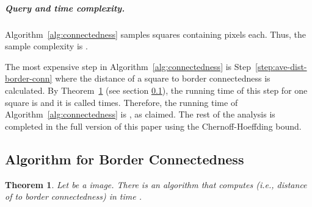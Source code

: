 \documentclass[11pt,english]{article}
\newtheorem{theorem}{Theorem}[section]
\numberwithin{figure}{section}
\begin{document}
\subparagraph{Query and time complexity.}
Algorithm~\ref{alg:connectedness} samples  squares containing  pixels each. Thus, the sample complexity is .

The most expensive step in Algorithm~\ref{alg:connectedness} is Step~\ref{step:ave-dist-border-conn} where the distance of a square  to border connectedness is calculated. By Theorem~\ref{thm:border-con} (see section \ref{sec:border-con}), the running time of this step for one square is  and it is called  times. Therefore, the running time of Algorithm~\ref{alg:connectedness} is , as claimed.
\else
The rest of the analysis is completed in the {\color{black} full version of this paper} using the Chernoff-Hoeffding bound.
\fi

\subsection{Algorithm for Border Connectedness}
\label{sec:border-con}

\begin{theorem}
\label{thm:border-con}
Let  be a  image. There is an algorithm that computes  (i.e., distance of  to border connectedness) in time .
\end{theorem}
\end{document}
